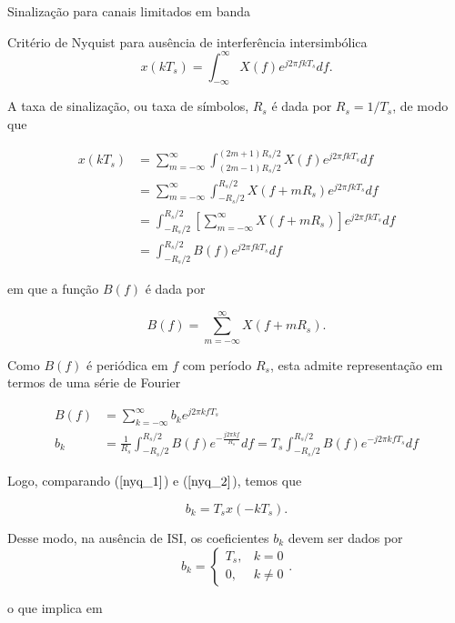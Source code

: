 \documentclass[
  ignorenonframetext,
]{beamer}
\begin{document}
\begin{frame}{Sinalização para canais limitados em banda}
\begin{block}{Critério de Nyquist para ausência de interferência
intersimbólica}
\begin{equation}
x(kT_s) =\int_{-\infty}^{\infty} X(f) e^{j 2 \pi f k T_s} d f.
\end{equation}

A taxa de sinalização, ou taxa de símbolos, \(R_s\) é dada por
\(R_s = 1/T_s\), de modo que

\[
\begin{align}
x(kT_s) & =\sum_{m=-\infty}^{\infty} \int_{(2 m-1) R_s/2}^{(2 m+1) R_s/2} X(f) e^{j 2 \pi f kT_s} d f\nonumber \\
& =\sum_{m=-\infty}^{\infty} \int_{-R_s/2}^{R_s/2} X(f+ m R_s) e^{j 2 \pi f kT_s} d f \nonumber\\
& =\int_{-R_s/2}^{R_s/2}\left[\sum_{m=-\infty}^{\infty} X(f+m R_s)\right] e^{j 2 \pi f kT_s} d f \nonumber\\
& =\int_{-R_s/2}^{R_s/2} B(f) e^{j 2 \pi f kT_s} d f\label{nyq_1}
\end{align}
\]

em que a função \(B(f)\) é dada por

\begin{equation}
B(f)=\sum_{m=-\infty}^{\infty} X(f+mR_s).
\end{equation}

Como \(B(f)\) é periódica em \(f\) com período \(R_s\), esta admite
representação em termos de uma série de Fourier

\[
\begin{align}
B(f)&=\sum_{k=-\infty}^{\infty} b_k e^{j 2 \pi k f T_s} \nonumber \\
b_k&=\frac{1}{R_s} \int_{-R_s / 2}^{R_s/ 2} B(f) e^{-\frac{j2 \pi k f}{R_s}} d f = T_s \int_{-R_s / 2}^{R_s/ 2} B(f) e^{-j2 \pi k f T_s} d f \label{nyq_2}
\end{align}
\]

Logo, comparando (\(\ref{nyq_1}\)) e (\(\ref{nyq_2}\)), temos que

\begin{equation}
b_k=T_s x(-k T_s).
\end{equation}

Desse modo, na ausência de ISI, os coeficientes \(b_k\) devem ser dados
por \begin{equation}\label{fourier_coeffs}
b_k=\begin{cases}T_s, & k=0 \\ 0, & k \neq 0\end{cases}.
\end{equation}

o que implica em


\end{block}
\end{frame}
\end{document}

